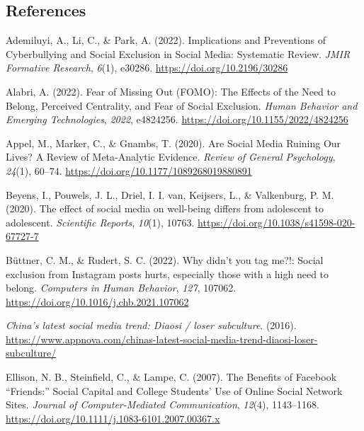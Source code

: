 \documentclass[]{interact}
\theoremstyle{plain}%
\theoremstyle{definition}
\theoremstyle{remark}
\newlength{\cslhangindent}
\newlength{\cslentryspacingunit} %
\newenvironment{CSLReferences}[2] %
 {%
  \setlength{\parindent}{0pt}
  \ifodd #1
  \let\oldpar\par
  \def\par{\hangindent=\cslhangindent\oldpar}
  \fi
  \setlength{\parskip}{#2\cslentryspacingunit}
 }%
 {}
\begin{document}
\newpage{}

\hypertarget{references}{%
\subsection{References}\label{references}}

\hypertarget{refs}{}
\begin{CSLReferences}{1}{0}
\leavevmode{}%
Ademiluyi, A., Li, C., \& Park, A. (2022). Implications and Preventions
of Cyberbullying and Social Exclusion in Social Media: Systematic
Review. \emph{JMIR Formative Research}, \emph{6}(1), e30286.
\url{https://doi.org/10.2196/30286}

\leavevmode{}%
Alabri, A. (2022). Fear of Missing Out (FOMO): The Effects of the Need
to Belong, Perceived Centrality, and Fear of Social Exclusion.
\emph{Human Behavior and Emerging Technologies}, \emph{2022}, e4824256.
\url{https://doi.org/10.1155/2022/4824256}

\leavevmode{}%
Appel, M., Marker, C., \& Gnambs, T. (2020). Are Social Media Ruining
Our Lives? A Review of Meta-Analytic Evidence. \emph{Review of General
Psychology}, \emph{24}(1), 60--74.
\url{https://doi.org/10.1177/1089268019880891}

\leavevmode{}%
Beyens, I., Pouwels, J. L., Driel, I. I. van, Keijsers, L., \&
Valkenburg, P. M. (2020). The effect of social media on well-being
differs from adolescent to adolescent. \emph{Scientific Reports},
\emph{10}(1), 10763. \url{https://doi.org/10.1038/s41598-020-67727-7}

\leavevmode{}%
Büttner, C. M., \& Rudert, S. C. (2022). Why didn't you tag me?!: Social
exclusion from Instagram posts hurts, especially those with a high need
to belong. \emph{Computers in Human Behavior}, \emph{127}, 107062.
\url{https://doi.org/10.1016/j.chb.2021.107062}

\leavevmode{}%
\emph{China{'}s latest social media trend: Diaosi / loser subculture}.
(2016).
\url{https://www.appnova.com/chinas-latest-social-media-trend-diaosi-loser-subculture/}

\leavevmode{}%
Ellison, N. B., Steinfield, C., \& Lampe, C. (2007). The Benefits of
Facebook {``}Friends:{''} Social Capital and College Students{'} Use of
Online Social Network Sites. \emph{Journal of Computer-Mediated
Communication}, \emph{12}(4), 1143--1168.
\url{https://doi.org/10.1111/j.1083-6101.2007.00367.x}


\end{CSLReferences}
\end{document}
